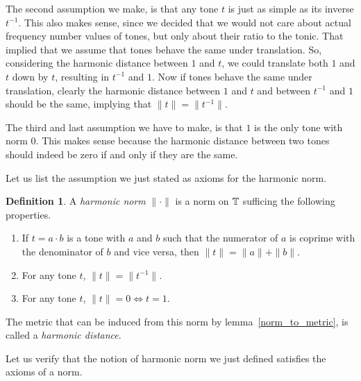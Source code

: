 \documentclass[a4paper]{book}
\theoremstyle{definition}
\newtheorem{definition}[theorem]{Definition}
\begin{document}
The second assumption we make, is that any tone $t$ is just as simple as its inverse $t^{-1}$.
This also makes sense, since we decided that we would not care about actual frequency number values of tones, but only about their ratio to the tonic. 
That implied that we assume that tones behave the same under translation.
So, considering the harmonic distance between $1$ and $t$, we could translate both $1$ and $t$ down by $t$, resulting in $t^{-1}$ and $1$.
Now if tones behave the same under translation, clearly the harmonic distance between $1$ and $t$ and between $t^{-1}$ and $1$ should be the same, implying that $\|t\| = \|t^{-1}\|$.

The third and last assumption we have to make, is that $1$ is the only tone with norm $0$.
This makes sense because the harmonic distance between two tones should indeed be zero if and only if they are the same.

Let us list the assumption we just stated as axioms for the harmonic norm.
\begin{definition}
    A \emph{harmonic norm} $\| \cdot \|$ is a norm on $\mathbb{T}$ sufficing the following properties.
    \begin{enumerate}[i]
        \item If $t = a \cdot b$ is a tone with $a$ and $b$ such that the numerator of $a$ is coprime with the denominator of $b$ and vice versa, then $\|t\| = \|a\|+\|b\|$.
        \item For any tone $t$, $\|t\| = \|t^{-1}\|$.
        \item For any tone $t$, $\|t\| = 0 \Leftrightarrow t = 1$.
    \end{enumerate}
    The metric that can be induced from this norm by lemma~\ref{norm_to_metric}, is called a \emph{harmonic distance}.
\end{definition}

Let us verify that the notion of harmonic norm we just defined satisfies the axioms of a norm.
\end{document}
